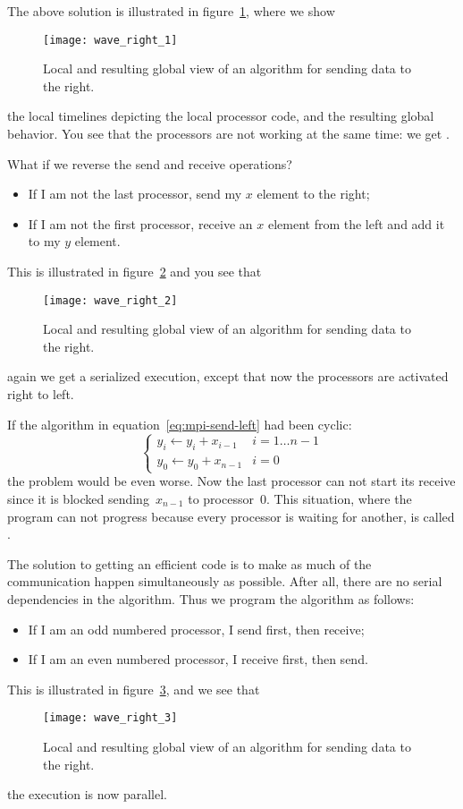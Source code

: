 The above solution is illustrated in figure~\ref{fig:wave_right_1},
where we show
\begin{figure}
  \texttt{[image: wave\_right\_1]}
  \caption{Local and resulting global view of an algorithm for sending
    data to the right.}
  \label{fig:wave_right_1}
\end{figure}
the local timelines depicting the local processor code, and the resulting
global behavior. You see that the processors are not working at the
same time: we get .

What if we reverse the send and receive operations?
\begin{itemize}
\item If I am not the last processor, send my $x$ element to the
  right;
\item If I am not the first processor, receive an $x$ element from the
  left and add it to my $y$ element.
\end{itemize}
This is illustrated in figure~\ref{fig:wave_right_2} and you see that
\begin{figure}
  \texttt{[image: wave\_right\_2]}
  \caption{Local and resulting global view of an algorithm for sending
    data to the right.}
  \label{fig:wave_right_2}
\end{figure}
again we get a serialized execution, except that now the processors are
activated right to left.

If the algorithm in equation~\ref{eq:mpi-send-left} had been cyclic:
\begin{equation}
\begin{cases}
y_i\leftarrow y_i+x_{i-1}&i=1\ldots n-1\\ 
y_0\leftarrow y_0+x_{n-1}&i=0
\end{cases}
\label{eq:cyclic-add}
\end{equation}
the problem would be even worse. Now the last processor can not start
its receive since it is blocked sending~$x_{n-1}$ to processor~0. This
situation, where the program can not progress because every processor is
waiting for another, is called . 

The solution to getting an efficient code is to make as much of the
communication happen simultaneously as possible. After all, there are
no serial dependencies in the algorithm. Thus we program the algorithm
as follows:
\begin{itemize}
\item If I am an odd numbered processor, I send first, then receive;
\item If I am an even numbered processor, I receive first, then send.
\end{itemize}
This is illustrated in figure~\ref{fig:wave_right_3}, and we see that
\begin{figure}
  \texttt{[image: wave\_right\_3]}
  \caption{Local and resulting global view of an algorithm for sending
    data to the right.}
  \label{fig:wave_right_3}
\end{figure}
the execution is now parallel.

